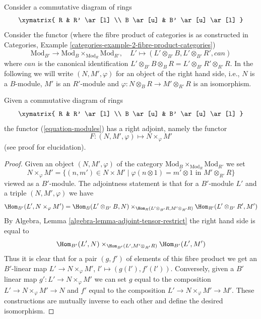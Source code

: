 \noindent
Consider a commutative diagram of rings
$$
\xymatrix{
R &
R' \ar[l] \\
B \ar[u] &
B' \ar[u] \ar[l]
}
$$
Consider the functor (where the fibre product of categories is
as constructed in
Categories, Example \ref{categories-example-2-fibre-product-categories})
\begin{equation}
\label{equation-modules}
\text{Mod}_{B'} \longrightarrow
\text{Mod}_B \times_{\text{Mod}_R} \text{Mod}_{R'},\quad
L' \longmapsto (L' \otimes_{B'} B, L' \otimes_{B'} R', can)
\end{equation}
where $can$ is the canonical identification
$L' \otimes_{B'} B \otimes_B R = L' \otimes_{B'} R' \otimes_{R'} R$.
In the following we will write $(N, M', \varphi)$ for an object
of the right hand side, i.e., $N$ is a $B$-module, $M'$ is an $R'$-module
and $\varphi : N \otimes_B R \to M' \otimes_{R'} R$ is an isomorphism.

\begin{lemma}
\label{lemma-modules}
Given a commutative diagram of rings
$$
\xymatrix{
R &
R' \ar[l] \\
B \ar[u] &
B' \ar[u] \ar[l]
}
$$
the functor (\ref{equation-modules}) has a right adjoint,
namely the functor
$$
F : (N, M', \varphi) \longmapsto N \times_\varphi M'
$$
(see proof for elucidation).
\end{lemma}

\begin{proof}
Given an object $(N, M', \varphi)$ of the category
$\text{Mod}_B \times_{\text{Mod}_R} \text{Mod}_{R'}$
we set
$$
N \times_\varphi M' = \{(n, m') \in N \times M' \mid
\varphi(n \otimes 1) = m' \otimes 1\text{ in }M' \otimes_{R'} R\}
$$
viewed as a $B'$-module.
The adjointness statement is that for a $B'$-module $L'$ and
a triple $(N, M', \varphi)$ we have
$$
\Hom_{B'}(L', N \times_\varphi M') =
\Hom_B(L' \otimes_{B'} B, N)
\times_{\Hom_R(L' \otimes_{B'} R, M' \otimes_{R'} R)}
\Hom_{R'}(L' \otimes_{B'} R', M')
$$
By Algebra, Lemma \ref{algebra-lemma-adjoint-tensor-restrict}
the right hand side is equal to
$$
\Hom_{B'}(L', N) \times_{\Hom_{B'}(L', M' \otimes_{R'} R)} \Hom_{B'}(L', M')
$$
Thus it is clear that for a pair $(g, f')$ of elements
of this fibre product we get an $B'$-linear map
$L' \to N \times_\varphi M'$, $l' \mapsto (g(l'), f'(l'))$.
Conversely, given a $B'$ linear map $g' : L' \to N \times_\varphi M'$
we can set $g$ equal to the composition $L' \to N \times_\varphi M' \to N$
and $f'$ equal to the composition $L' \to N \times_\varphi M' \to M'$.
These constructions are mutually inverse to each other and
define the desired isomorphism.
\end{proof}






